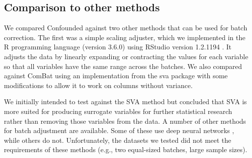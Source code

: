 \documentclass[11pt]{article}
\begin{document}
\subsection{Comparison to other methods}

We compared Confounded against two other methods that can be used for batch correction. The first was a simple scaling adjuster,
which we implemented in the R programming language (version 3.6.0) \citep{r_core_team_r_2014} using RStudio version 1.2.1194 \citep{rstudio_team_rstudio_2018}.
It adjusts the data by linearly expanding or contracting the values for each variable so that all variables have the same range across the batches.
We also compared against ComBat \citep{johnson_adjusting_2007} using an implementation from the sva package \citep{leek_sva_2017} with some modifications to allow it to work on columns without variance.

We initially intended to test against the SVA \citep{leek_capturing_2007} method but concluded that SVA is more suited for producing surrogate variables for further statistical research rather than removing those variables from the data.
A number of other methods for batch adjustment are available. Some of these use deep neural networks \citep{shaham_removal_2017,shaham_batch_2018,upadhyay_removal_2019}, while others do not\citep{espin-perez_comparison_2018}.
Unfortunately, the datasets we tested did not meet the requirements of these methods (e.g., two equal-sized batches, large sample sizes).
\end{document}
